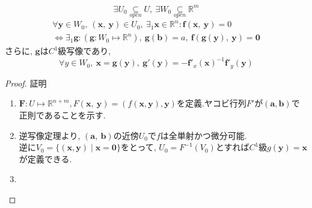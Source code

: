 \documentclass[dvipdfmx]{jsarticle}
\newcommand{\opensubset}{\underset{open}{\subseteq}}
\begin{document}
\begin{description}
        $$\exists U_0 \opensubset U,\ \exists W_0 \opensubset \mathbb{R}^m$$
        \begin{eqnarray*}
            \forall \bm{y} \in W_0,\ (\bm{x},\ \bm{y}) \in U_0,\ \exists_1 \bm{x} \in \mathbb{R}^n : \bm{f}(\bm{x},\ \bm{y}) = 0 \\
            \Leftrightarrow \exists_1 \bm{g} : (\bm{g} : W_0 \mapsto \mathbb{R}^n),\ \bm{g}(\bm{b}) = a,\ \bm{f}(\bm{g}(\bm{y}),\ \bm{y}) = \bm{0}
        \end{eqnarray*}
        さらに, $\bm{g}$は$C^1$級写像であり, 
        $$ \forall y \in W_0,\ \bm{x} = \bm{g}(\bm{y}),\ \bm{g}'(\bm{y}) = - \bm{f}'_x(\bm{x})^{-1} \bm{f}'_y(\bm{y}) $$

        \begin{proof} 証明
            \begin{enumerate}
                \item $\bm{F} : U \mapsto \mathbb{R}^{n+m}, F(\bm{x},\ \bm{y}) = ( f(\bm{x}, \bm{y}), \bm{y})$を定義.ヤコビ行列$F'$が$(\bm{a},\bm{b})$で正則であることを示す.
                \item 逆写像定理より, $(\bm{a},\ \bm{b})$の近傍$U_0$で$f$は全単射かつ微分可能. \\
                逆に$V_0 = \{ (\bm{x},\bm{y}) \mid \bm{x} = \bm{0} \}$をとって, $U_0 = F^{-1}(V_0)$とすれば$C^1$級$g(\bm{y}) = \bm{x}$が定義できる.
                \item %
            \end{enumerate}
        \end{proof}
    

\end{description}
\end{document}
